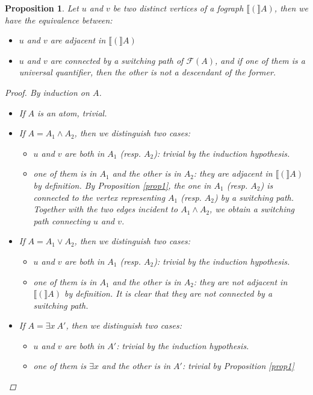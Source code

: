 \documentclass[conference,twosided,10pt]{IEEEtran}
\newtheorem{proposition}[thm]{Proposition}
\theoremstyle{definition}
\newcommand{\cor}{\vee}
\newcommand{\cand}{\wedge}
\newcommand{\graphof}[1]{\llbracket#1\rrbracket}
\newcommand{\formtree}[1]{\mathcal{F}(#1)}
\begin{document}
\begin{proposition}
\label{prop2}
Let $u$ and $v$ be two distinct vertices of a fograph $\graphof(A)$, then we have the equivalence
between:
\begin{itemize}
  \item $u$ and $v$ are adjacent in $\graphof(A)$
  \item $u$ and $v$ are connected by a switching path of $\formtree{A}$, and if one of them is a universal quantifier, then the other is
	not a descendant of the former.
  \end{itemize}
\begin{proof}
By induction on $A$.
\begin{itemize}
  \item If $A$ is an atom, trivial.
  \item If $A = A_1 \cand A_2$, then we distinguish two cases:
    \begin{itemize}
      \item $u$ and $v$ are both in $A_1$ (resp. $A_2$): trivial by
	      the induction hypothesis.
      \item one of them is in $A_1$ and the other is in $A_2$: they are
	      adjacent in $\graphof(A)$ by definition. By Proposition \ref{prop1},
		    the one in $A_1$ (resp. $A_2$) is connected to the
		    vertex representing $A_1$ (resp. $A_2$) by a switching
		    path. Together with the two edges incident to $A_1 \cand
		    A_2$, we obtain a switching path connecting $u$ and $v$.
    \end{itemize}
  \item If $A = A_1 \cor A_2$, then we distinguish two cases:
    \begin{itemize}
      \item $u$ and $v$ are both in $A_1$ (resp. $A_2$): trivial by
	      the induction hypothesis.
      \item one of them is in $A_1$ and the other is in $A_2$: they are not
	      adjacent in $\graphof(A)$ by definition. It is clear that they
		    are not connected by a switching path.
    \end{itemize}
  \item If $A = \exists x \ A'$, then we distinguish two cases:
    \begin{itemize}
      \item $u$ and $v$ are both in $A'$: trivial by the induction
	      hypothesis.
      \item one of them is $\exists x$ and the other is in $A'$: trivial
	      by Proposition \ref{prop1}


\end{itemize}
\end{itemize}
\end{proof}
\end{proposition}
\end{document}
